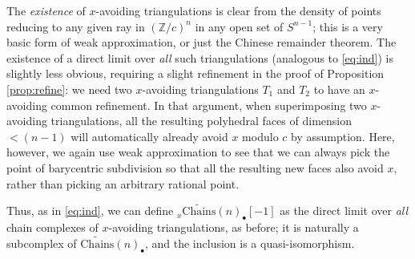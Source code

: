 \documentclass[10pt]{amsart}
\theoremstyle{definition}
\newcommand{\Z}{\mathbb{Z}}
\newcommand{\Chains}{\mathrm{Chains}}
\numberwithin{equation}{section}
\begin{document}
    The \emph{existence} of $x$-avoiding triangulations is clear from the density of points reducing to any given ray in $(\Z/c)^n$ in any open set of $S^{n-1}$; this is a very basic form of weak approximation, or just the Chinese remainder theorem. The existence of a direct limit over \emph{all} such triangulations (analogous to \eqref{eq:ind}) is slightly less obvious, requiring a slight refinement in the proof of Proposition \ref{prop:refine}: we need two $x$-avoiding triangulations $T_1$ and $T_2$ to have an $x$-avoiding common refinement. In that argument, when superimposing two $x$-avoiding triangulations, all the resulting polyhedral faces of dimension $<(n-1)$ will automatically already avoid $x$ modulo $c$ by assumption. Here, however, we again use weak approximation to see that we can always pick the point of barycentric subdivision so that all the resulting new faces also avoid $x$, rather than picking an arbitrary rational point.
    
    Thus, as in \eqref{eq:ind}, we can define ${}_x\widetilde{\Chains}(n)_\bullet[-1]$ as the direct limit over \emph{all} chain complexes of $x$-avoiding triangulations, as before; it is naturally a subcomplex of $\widetilde{\Chains}(n)_\bullet$, and the inclusion is a quasi-isomorphism. 
    
\end{document}
